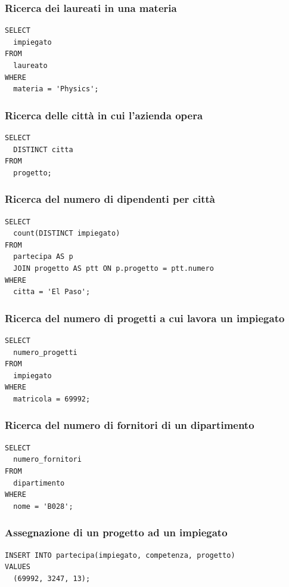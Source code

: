 \documentclass{article}
\begin{document}
\subsubsection{Ricerca dei laureati in una materia}
\begin{verbatim}
SELECT 
  impiegato 
FROM 
  laureato 
WHERE 
  materia = 'Physics';
\end{verbatim}

\subsubsection{Ricerca delle città in cui l'azienda opera}
\begin{verbatim}
SELECT 
  DISTINCT citta 
FROM 
  progetto;
\end{verbatim}

\subsubsection{Ricerca del numero di dipendenti per città}
\begin{verbatim}
SELECT 
  count(DISTINCT impiegato) 
FROM 
  partecipa AS p 
  JOIN progetto AS ptt ON p.progetto = ptt.numero 
WHERE 
  citta = 'El Paso';
\end{verbatim}

\subsubsection{Ricerca del numero di progetti a cui lavora un impiegato}
\begin{verbatim}
SELECT 
  numero_progetti 
FROM 
  impiegato 
WHERE 
  matricola = 69992;
\end{verbatim}

\subsubsection{Ricerca del numero di fornitori di un dipartimento}
\begin{verbatim}
SELECT 
  numero_fornitori 
FROM 
  dipartimento 
WHERE 
  nome = 'B028';
\end{verbatim}

\subsubsection{Assegnazione di un progetto ad un impiegato}
\begin{verbatim}
INSERT INTO partecipa(impiegato, competenza, progetto) 
VALUES 
  (69992, 3247, 13);
\end{verbatim}
\end{document}
